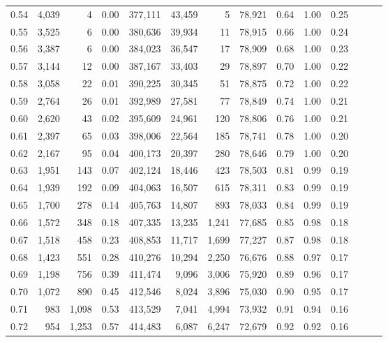 \begin{tabular}{rrrrrrrrrrrrrr}
0.54 &  4,039 &      4 &  0.00 &  377,111 &   43,459 &       5 &  78,921 &  0.64 &  1.00 &      0.25 \\
0.55 &  3,525 &      6 &  0.00 &  380,636 &   39,934 &      11 &  78,915 &  0.66 &  1.00 &      0.24 \\
0.56 &  3,387 &      6 &  0.00 &  384,023 &   36,547 &      17 &  78,909 &  0.68 &  1.00 &      0.23 \\
0.57 &  3,144 &     12 &  0.00 &  387,167 &   33,403 &      29 &  78,897 &  0.70 &  1.00 &      0.22 \\
0.58 &  3,058 &     22 &  0.01 &  390,225 &   30,345 &      51 &  78,875 &  0.72 &  1.00 &      0.22 \\
0.59 &  2,764 &     26 &  0.01 &  392,989 &   27,581 &      77 &  78,849 &  0.74 &  1.00 &      0.21 \\
0.60 &  2,620 &     43 &  0.02 &  395,609 &   24,961 &     120 &  78,806 &  0.76 &  1.00 &      0.21 \\
0.61 &  2,397 &     65 &  0.03 &  398,006 &   22,564 &     185 &  78,741 &  0.78 &  1.00 &      0.20 \\
0.62 &  2,167 &     95 &  0.04 &  400,173 &   20,397 &     280 &  78,646 &  0.79 &  1.00 &      0.20 \\
0.63 &  1,951 &    143 &  0.07 &  402,124 &   18,446 &     423 &  78,503 &  0.81 &  0.99 &      0.19 \\
0.64 &  1,939 &    192 &  0.09 &  404,063 &   16,507 &     615 &  78,311 &  0.83 &  0.99 &      0.19 \\
0.65 &  1,700 &    278 &  0.14 &  405,763 &   14,807 &     893 &  78,033 &  0.84 &  0.99 &      0.19 \\
0.66 &  1,572 &    348 &  0.18 &  407,335 &   13,235 &   1,241 &  77,685 &  0.85 &  0.98 &      0.18 \\
0.67 &  1,518 &    458 &  0.23 &  408,853 &   11,717 &   1,699 &  77,227 &  0.87 &  0.98 &      0.18 \\
0.68 &  1,423 &    551 &  0.28 &  410,276 &   10,294 &   2,250 &  76,676 &  0.88 &  0.97 &      0.17 \\
0.69 &  1,198 &    756 &  0.39 &  411,474 &    9,096 &   3,006 &  75,920 &  0.89 &  0.96 &      0.17 \\
0.70 &  1,072 &    890 &  0.45 &  412,546 &    8,024 &   3,896 &  75,030 &  0.90 &  0.95 &      0.17 \\
0.71 &    983 &  1,098 &  0.53 &  413,529 &    7,041 &   4,994 &  73,932 &  0.91 &  0.94 &      0.16 \\
0.72 &    954 &  1,253 &  0.57 &  414,483 &    6,087 &   6,247 &  72,679 &  0.92 &  0.92 &      0.16 \\

\end{tabular}
